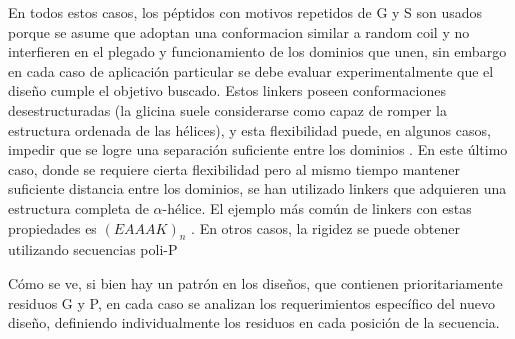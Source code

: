 

En todos estos casos, los péptidos con motivos repetidos de G y S son usados porque se asume que adoptan una conformacion similar a random coil y no interfieren en el plegado y funcionamiento de los dominios que unen,
sin embargo en cada caso de aplicación particular se debe evaluar experimentalmente que el diseño cumple el objetivo buscado.
Estos linkers poseen conformaciones desestructuradas (la glicina suele considerarse como capaz de romper la estructura ordenada de las hélices), y esta flexibilidad puede, en algunos casos, impedir que se logre una separación 
suficiente entre los dominios \cite{evers2006quantitative}.
En este último caso, donde se requiere cierta flexibilidad pero al mismo tiempo mantener suficiente distancia entre los dominios, se han utilizado linkers que adquieren una estructura completa de $\alpha$-hélice.
El ejemplo más común de linkers con estas propiedades es $(EAAAK)_n$ \cite{arai2001design}. 
En otros casos, la rigidez se puede obtener utilizando secuencias poli-P \cite{schuler2005polyproline}


Cómo se ve, si bien hay un patrón en los diseños, que contienen prioritariamente residuos G y P, en cada caso se analizan los requerimientos específico del nuevo diseño, 
definiendo individualmente los residuos en cada posición de la secuencia.


% 







